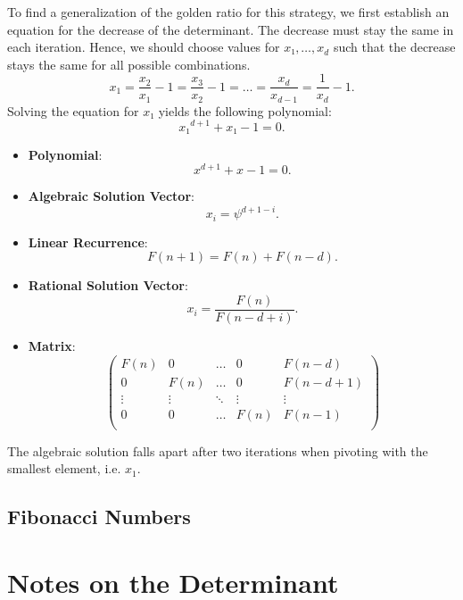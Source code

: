 \documentclass[english,version-2020-11]{uzl-thesis}
\begin{document}
To find a generalization of the golden ratio for this strategy,
we first establish an equation for the decrease of the determinant.
The decrease must stay the same in each iteration.
Hence, we should choose values for $x₁, \dots, x_d$ such that the decrease
stays the same for all possible combinations.
\[
  x_1 = \frac{x_2}{x_1} - 1 = \frac{x_3}{x_2} - 1 = \dots = \frac{x_d}{x_{d-1}} = \frac{1}{x_d} - 1.
\]
Solving the equation for $x₁$ yields the following polynomial:
\[
  x₁^{d+1} + x₁ - 1 = 0.
\]

\begin{itemize}
  \item \textbf{Polynomial}: \[x^{d+1} + x - 1 = 0.\]
  \item \textbf{Algebraic Solution Vector}: \[x_i = \psi^{d+1-i}.\]
  \item \textbf{Linear Recurrence}: \[F(n + 1) = F(n) + F(n - d).\]
  \item \textbf{Rational Solution Vector}: \[x_i = \frac{F(n)}{F(n-d+i)}.\]
  \item \textbf{Matrix}:
    \[\left(\begin{array}{cccc|c}
      F(n)   & 0      & \dots  & 0      & F(n - d) \\
        0    & F(n)   & \dots  & 0      & F(n - d + 1) \\
      \vdots & \vdots & \ddots & \vdots & \vdots   \\
        0    & 0      & \dots  & F(n)   & F(n - 1) \\
    \end{array}\right)\]
\end{itemize}

The algebraic solution falls apart after two iterations when pivoting with the
smallest element, i.e. $x_1$.

\section{Fibonacci Numbers}




\chapter{Notes on the Determinant}

\end{document}
